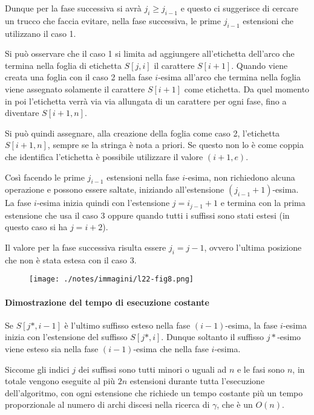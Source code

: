 Dunque per la fase successiva si avrà $j_i \geq j_{i-1}$ e questo ci suggerisce di cercare un trucco che faccia evitare, nella fase successiva, le prime $j_{i-1}$ estensioni che utilizzano il caso 1.

Si può osservare che il caso 1 si limita ad aggiungere all'etichetta dell'arco che termina nella foglia di etichetta $S[j,i]$ il carattere $S[i+1]$.
Quando viene creata una foglia con il caso 2 nella fase $i$-esima all'arco che termina nella foglia viene assegnato solamente il carattere $S[i+1]$ come etichetta. 
Da quel momento in poi l'etichetta verrà via via allungata di un carattere per ogni fase, fino a diventare $S[i+1,n]$.

Si può quindi assegnare, alla creazione della foglia come caso 2, l'etichetta $S[i+1,n]$, sempre se la stringa è nota a priori. Se questo non lo è come coppia che identifica l'etichetta è possibile utilizzare il valore $(i+1,e)$.

Così facendo le prime $j_{i-1}$ estensioni nella fase $i$-esima, non richiedono alcuna operazione e possono essere saltate, iniziando all'estensione $(j_{i-1}+1)$-esima. La fase $i$-esima inizia quindi con l'estensione $j = i_{j-1}+1$ e termina con la prima estensione che usa il caso 3 oppure quando tutti i suffissi sono stati estesi (in questo caso si ha $j = i+2$).

Il valore per la fase successiva risulta essere $j_i = j-1$, ovvero l'ultima posizione che non è stata estesa con il caso 3.

\begin{figure}[htbp]
	\centering
	\texttt{[image: ./notes/immagini/l22-fig8.png]}
\end{figure}

\paragraph{Dimostrazione del tempo di esecuzione costante}

Se $S[j*, i-1]$ è l'ultimo suffisso esteso nella fase $(i-1)$-esima, la fase $i$-esima inizia con l'estensione del suffisso $S[j*,i]$. Dunque soltanto il suffisso $j*$-esimo viene esteso sia nella fase $(i-1)$-esima che nella fase $i$-esima.

Siccome gli indici $j$ dei suffissi sono tutti minori o uguali ad $n$ e le fasi sono $n$, in totale vengono eseguite al più $2n$ estensioni durante tutta l'esecuzione dell'algoritmo, con ogni estensione che richiede un tempo costante più un tempo proporzionale al numero di archi discesi nella ricerca di $\gamma$, che è un $O(n)$.

